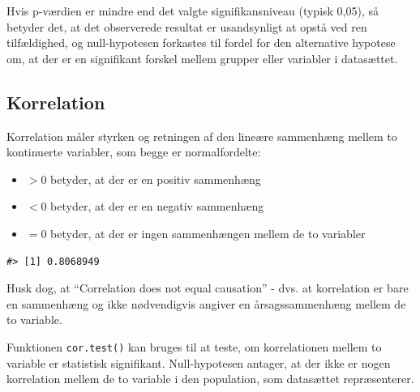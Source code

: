 \documentclass[
]{book}
\newenvironment{Shaded}{\begin{snugshade}}{\end{snugshade}}
\newcommand{\FunctionTok}[1]{\textcolor[rgb]{0.27,0.27,0.27}{\textbf{#1}}}
\newcommand{\NormalTok}[1]{#1}
\newcommand{\SpecialCharTok}[1]{\textcolor[rgb]{0.43,0.43,0.43}{\textbf{#1}}}
\providecommand{\tightlist}{%
  \setlength{\itemsep}{0pt}\setlength{\parskip}{0pt}}
\begin{document}
Hvis p-værdien er mindre end det valgte signifikansniveau (typisk 0,05), så betyder det, at det observerede resultat er usandsynligt at opstå ved ren tilfældighed, og null-hypotesen forkastes til fordel for den alternative hypotese om, at der er en signifikant forskel mellem grupper eller variabler i datasættet.

\subsection{Korrelation}\label{korrelation}

Korrelation måler styrken og retningen af den lineære sammenhæng mellem to kontinuerte variabler, som begge er normalfordelte:

\begin{itemize}
\tightlist
\item
  \(>0\) betyder, at der er en positiv sammenhæng
\item
  \(<0\) betyder, at der er en negativ sammenhæng
\item
  \(=0\) betyder, at der er ingen sammenhængen mellem de to variabler
\end{itemize}

\begin{Shaded}
\end{Shaded}

\begin{verbatim}
#> [1] 0.8068949
\end{verbatim}

Husk dog, at ``Correlation does not equal causation'' - dvs. at korrelation er bare en sammenhæng og ikke nødvendigvis angiver en årsagssammenhæng mellem de to variable.

Funktionen \texttt{cor.test()} kan bruges til at teste, om korrelationen mellem to variable er statistisk signifikant. Null-hypotesen antager, at der ikke er nogen korrelation mellem de to variable i den population, som datasættet repræsenterer.

\begin{Shaded}
\end{Shaded}
\end{document}
